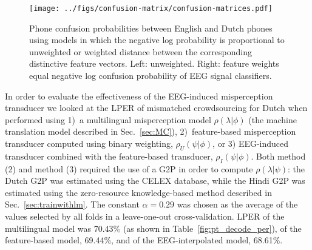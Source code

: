 \begin{figure}
  \centerline{
    \texttt{[image: ../figs/confusion-matrix/confusion-matrices.pdf]}
  }
    \vspace*{-0.3cm}
  \caption{Phone confusion probabilities between English and Dutch
    phones using models in which the negative log
    probability is proportional to unweighted or weighted
    distance between the corresponding
    distinctive feature vectors.  Left: unweighted.
    Right: feature weights equal negative log confusion
    probability of EEG signal classifiers.}
  \label{fig:eeg_confusions}
\end{figure}

In order to evaluate the effectiveness of the EEG-induced
misperception transducer we looked at the LPER of mismatched
crowdsourcing for Dutch when performed using 1)~a multilingual
misperception model $\rho(\lambda|\phi)$ (the machine translation
model described in Sec.~\ref{sec:MC}), 2)~feature-based misperception
transducer computed using binary weighting, $\rho_U(\psi|\phi)$, or 3)
EEG-induced transducer combined with the feature-based transducer,
$\rho_I(\psi|\phi)$.  {\color{blue} Both method (2) and method (3)
required the use of a G2P in order to compute $\rho(\lambda|\psi)$:
the Dutch G2P was estimated using the CELEX database, while the Hindi
G2P was estimated using the zero-resource knowledge-based method
described in Sec.~\ref{sec:trainwithlm}.  The constant $\alpha=0.29$ was
chosen as the average of the values selected by all folds in a
leave-one-out cross-validation.}  LPER of the multilingual model was
70.43\% {\color{blue} (as shown in Table~\ref{fig:pt_decode_per})}, of
the feature-based model, 69.44\%, and of the EEG-interpolated model,
68.61\%.



